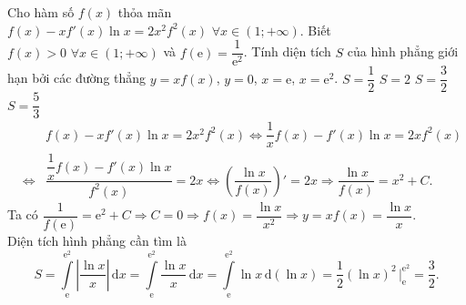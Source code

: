 \begin{ex}%
Cho hàm số $f(x)$ thỏa mãn $f(x)-xf'(x)\ln x=2x^2f^2(x)\,\,\forall x\in (1;+\infty )$. Biết $f(x)>0\,\,\forall x\in (1;+\infty )$ và $f(\mathrm{e})=\dfrac{1}{\mathrm{e}^2}$. Tính diện tích $S$ của hình phẳng giới hạn bởi các đường thẳng $y=xf(x)$, $y=0$, $x=\mathrm{e}$, $x=\mathrm{e}^2$.
\choice 
{$S=\dfrac{1}{2}$} 
{$S=2$}
{\True $S=\dfrac{3}{2}$} 
{$S=\dfrac{5}{3}$}
\loigiai
{
\begin{eqnarray*}
&&f(x)-xf'(x)\ln x=2x^2f^2(x)\Leftrightarrow \dfrac{1}{x}f(x)-f'(x)\ln x=2xf^2(x)\\&\Leftrightarrow &\dfrac{\dfrac{1}{x}f(x)-f'(x)\ln x}{f^2(x)}=2x\Leftrightarrow\left (\dfrac{\ln x}{f(x)} \right )'=2x\Rightarrow\dfrac{\ln x}{f(x)}=x^2+C.
\end{eqnarray*}
Ta có $\dfrac{1}{f(\mathrm{e})}=\mathrm{e}^2+C\Rightarrow C=0\Rightarrow f(x)=\dfrac{\ln x}{x^2}\Rightarrow y=xf(x)=\dfrac{\ln x}{x}$.\\
Diện tích hình phẳng cần tìm là
$$S=\displaystyle\int\limits_{\mathrm{e}}^{\mathrm{e}^2}\left |\dfrac{\ln x}{x} \right |\mathrm{\,d}x=\displaystyle\int\limits_{\mathrm{e}}^{\mathrm{e}^2}\dfrac{\ln x}{x} \mathrm{\,d}x=\displaystyle\int\limits_{\mathrm{e}}^{\mathrm{e}^2}\ln x\mathrm{\,d}(\ln x)=\dfrac{1}{2}\left (\ln x \right )^2\,\Big |_{\mathrm{e}}^{\mathrm{e}^2}=\dfrac{3}{2}.$$
}
\end{ex}

